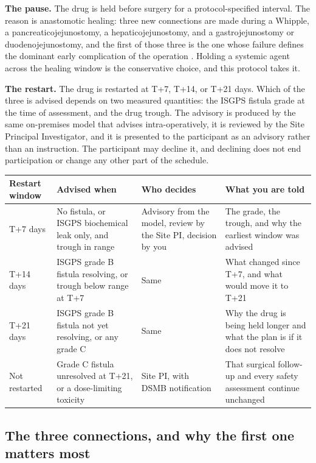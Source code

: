 \textbf{The pause.} The drug is held before surgery for a protocol-specified
interval. The reason is anastomotic healing: three new connections are made
during a Whipple, a pancreaticojejunostomy, a hepaticojejunostomy, and a
gastrojejunostomy or duodenojejunostomy, and the first of those three is the one
whose failure defines the dominant early complication of the operation
\cite{Bassi2017}. Holding a systemic agent across the healing window is the
conservative choice, and this protocol takes it.

\textbf{The restart.} The drug is restarted at T+7, T+14, or T+21 days. Which of
the three is advised depends on two measured quantities: the ISGPS fistula grade
at the time of assessment, and the drug trough. The advisory is produced by the
same on-premises model that advises intra-operatively, it is reviewed by the Site
Principal Investigator, and it is presented to the participant as an advisory
rather than an instruction. The participant may decline it, and declining does
not end participation or change any other part of the schedule.

\vspace{0.30em}

\noindent\begin{tabularx}{\textwidth}{L{2.2cm} L{4.2cm} L{3.0cm} Y}
\toprule
\textbf{Restart window} & \textbf{Advised when} & \textbf{Who decides} & \textbf{What you are told} \\
\midrule
T+7 days & No fistula, or ISGPS biochemical leak only, and trough in range & Advisory from the model, review by the Site PI, decision by you & The grade, the trough, and why the earliest window was advised \\
T+14 days & ISGPS grade B fistula resolving, or trough below range at T+7 & Same & What changed since T+7, and what would move it to T+21 \\
T+21 days & ISGPS grade B fistula not yet resolving, or any grade C & Same & Why the drug is being held longer and what the plan is if it does not resolve \\
Not restarted & Grade C fistula unresolved at T+21, or a dose-limiting toxicity & Site PI, with DSMB notification & That surgical follow-up and every safety assessment continue unchanged \\
\bottomrule
\end{tabularx}

\vspace{0.30em}

\subsection{The three connections, and why the first one matters most}

